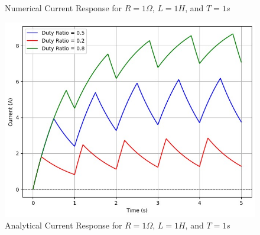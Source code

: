 \begin{multicols}{2}
\begin{figure}[H]
  \caption{Numerical Current Response for $R=1\Omega$, $L=1H$, and $T=1s$}
\end{figure}
\begin{figure}[H]
  \centering
  \includegraphics[width=\columnwidth]{sections/case1a.png}
  \caption{Analytical Current Response for $R=1\Omega$, $L=1H$, and $T=1s$}
\end{figure}


\end{multicols}
